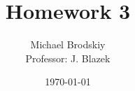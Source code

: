 


\title{Homework 3}
\date{\today}
\author{Michael Brodskiy\\ \small Professor: J. Blazek}



\maketitle

